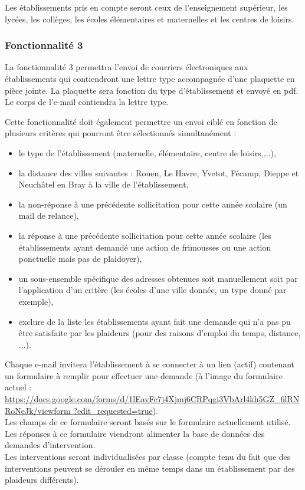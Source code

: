 Les établissements pris en compte seront ceux de l'enseignement supérieur, les lycées, les collèges, les écoles élémentaires et maternelles et les centres de loisirs. 


\subsubsection{Fonctionnalité 3}
La fonctionnalité 3 permettra l'envoi de courriers électroniques aux établissements qui contiendront une lettre type accompagnée d'une plaquette en pièce jointe. La plaquette sera fonction du type d'établissement et envoyé en pdf. Le corps de l'e-mail contiendra la lettre type. 

Cette fonctionnalité doit également permettre un envoi ciblé en fonction de plusieurs critères qui pourront être sélectionnés simultanément :
\begin{itemize}
\item le type de l'établissement (maternelle, élémentaire, centre de loisirs,...), 
\item la distance des villes suivantes : Rouen, Le Havre, Yvetot, Fécamp, Dieppe et Neuchâtel en Bray à la ville de l'établissement,
\item la non-réponse à une précédente sollicitation pour cette année scolaire (un mail de relance),
\item la réponse à une précédente sollicitation pour cette année scolaire (les établissements ayant demandé une action de frimousses ou une action ponctuelle mais pas de plaidoyer),
\item un sous-ensemble spécifique des adresses obtenues soit manuellement soit par l'application d'un critère (les écoles d'une ville donnée, un type donné par exemple),
\item exclure de la liste les établissements ayant fait une demande qui n'a pas pu être satisfaite par les plaideurs (pour des raisons d'emploi du temps, distance, ...). \\
\end{itemize}

Chaque e-mail invitera l'établissement à se connecter à un lien (actif) contenant un formulaire à remplir pour effectuer une demande (à l'image du formulaire actuel :
\url{https://docs.google.com/forms/d/1lEavFc7j4Xjmj6CRPqgi3VbArl4kh5GZ_6lRNRoNeJk/viewform
?edit_requested=true}).
\\
Les champs de ce formulaire seront basés sur le formulaire actuellement utilisé.  Les réponses à ce formulaire viendront alimenter la base de données des demandes d'intervention. \\
Les interventions seront individualisées par classe (compte tenu du fait que des interventions peuvent se dérouler en même temps dans un établissement par des plaideurs différents). 
\\

